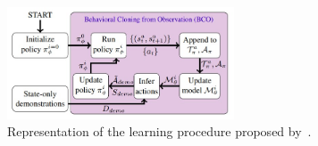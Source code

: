 \begin{figure}[tb]
    \centering
    \includegraphics[width=0.6\textwidth]{figures/images/bco/bco.jpg}
    \caption{Representation of the learning procedure proposed by~\cite{torabi2018bco}.}
    \label{fig:bco}
\end{figure}
